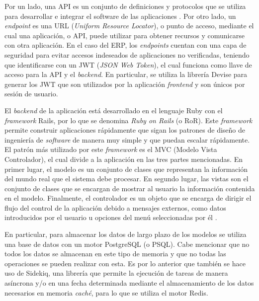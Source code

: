     Por un lado, una API es un conjunto de definiciones y protocolos que se utiliza para desarrollar e integrar el software de las aplicaciones \cite{redhat_api}. Por otro lado, un \textit{endpoint} es una URL (\textit{Uniform Resource Locator}), o punto de acceso, mediante el cual una aplicación, o API, puede utilizar para obtener recursos y comunicarse con otra aplicación. En el caso del ERP, los \textit{endpoints} cuentan con una capa de seguridad para evitar accesos indeseados de aplicaciones no verificadas, teniendo que identificarse con un JWT (\textit{JSON Web Token}), el cual funciona como llave de acceso para la API y el \textit{backend}. En particular, se utiliza la librería Devise para generar los JWT que son utilizados por la aplicación \textit{frontend} y son únicos por sesión de usuario.
    
    El \textit{backend} de la aplicación está desarrollado en el lenguaje Ruby con el \textit{framework} Rails, por lo que se denomina \textit{Ruby on Rails} (o RoR). Este \textit{framework} permite construir aplicaciones rápidamente que sigan los patrones de diseño de ingeniería de \textit{software} de manera muy simple y que puedan escalar rápidamente. El patrón más utilizado por este \textit{framework} es el MVC (Modelo Vista Controlador), el cual divide a la aplicación en las tres partes mencionadas. En primer lugar, el modelo es un conjunto de clases que representan la información del mundo real que el sistema debe procesar. En segundo lugar, las vistas son el conjunto de clases que se encargan de mostrar al usuario la información contenida en el modelo. Finalmente, el controlador es un objeto que se encarga de dirigir el flujo del control de la aplicación debido a mensajes externos, como datos introducidos por el usuario u opciones del menú seleccionadas por él \cite{mvc_architecture}.
   
   En particular, para almacenar los datos de largo plazo de los modelos se utiliza una base de datos con un motor PostgreSQL (o PSQL). Cabe mencionar que no todos los datos se almacenan en este tipo de memoria y que no todas las operaciones se pueden realizar con esta. Es por lo anterior que también se hace uso de Sidekiq, una librería que permite la ejecución de tareas de manera asíncrona y/o en una fecha determinada mediante el almacenamiento de los datos necesarios en memoria \textit{caché}, para lo que se utiliza el motor Redis.
   
